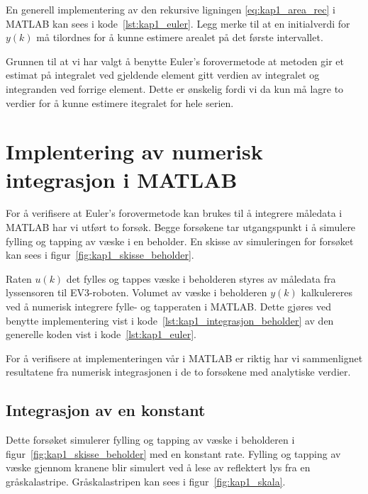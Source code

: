 \documentclass[main.tex]{subfiles}
\begin{document}
En generell implementering av den rekursive ligningen \eqref{eq:kap1_area_rec} i \textsc{MATLAB} kan sees i kode~\ref{lst:kap1_euler}. Legg merke til at en initialverdi for $y(k)$ må tilordnes for å kunne estimere arealet på det første intervallet.



Grunnen til at vi har valgt å benytte Euler's forovermetode at metoden gir et estimat på integralet ved gjeldende element gitt verdien av integralet og integranden ved forrige element. Dette er ønskelig fordi vi da kun må lagre to verdier for å kunne estimere itegralet for hele serien.

\section{Implentering av numerisk integrasjon i \textsc{MATLAB}}

For å verifisere at Euler's forovermetode kan brukes til å integrere måledata i \textsc{MATLAB} har vi utført to forsøk. Begge forsøkene tar utgangspunkt i å simulere fylling og tapping av væske i en beholder. En skisse av simuleringen for forsøket kan sees i figur~\ref{fig:kap1_skisse_beholder}.



Raten $u(k)$ det fylles og tappes væske i beholderen styres av måledata fra lyssensoren til \textsc{EV3}-roboten. Volumet av væske i beholderen $y(k)$ kalkulereres ved å numerisk integrere fylle- og tapperaten i \textsc{MATLAB}. Dette gjøres ved benytte implementering vist i kode~\ref{lst:kap1_integrasjon_beholder} av den generelle koden vist i kode~\ref{lst:kap1_euler}.



For å verifisere at implementeringen vår i \textsc{MATLAB} er riktig har vi sammenlignet resultatene fra numerisk integrasjonen i de to forsøkene med analytiske verdier.

\subsection{Integrasjon av en konstant}\label{sub:kap1_integrasjon_konstant}

Dette forsøket simulerer fylling og tapping av væske i beholderen i figur~\ref{fig:kap1_skisse_beholder} med en konstant rate. Fylling og tapping av væske gjennom kranene blir simulert ved å lese av reflektert lys fra en gråskalastripe. Gråskalastripen kan sees i figur~\ref{fig:kap1_skala}.
\end{document}
